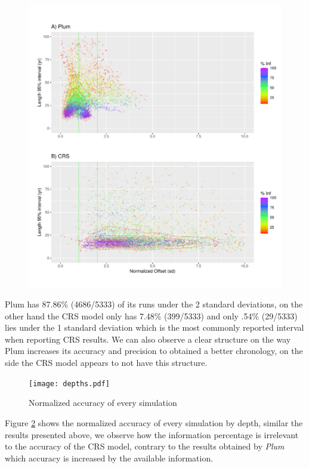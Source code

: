 \documentclass [10pt] {article}
\begin{document}
\begin{figure}
 \centering
  \includegraphics[width=\linewidth]{Maps.pdf}
	\caption{}
  \label{fig:maps}
\end{figure}


Plum has 87.86\% (4686/5333) of its runs under the 2 standard deviations, on the other hand the CRS model only has 7.48\% (399/5333) and only .54\% (29/5333) lies under the 1 standard deviation which is the most commonly reported interval when reporting CRS results.
We can also observe a clear structure on the way Plum increases its accuracy and precision to obtained a better chronology, on the side the CRS model appears to not have this structure. 


\begin{figure}
	\begin{centering}
		\texttt{[image: depths.pdf]}
		\caption{Normalized accuracy of every simulation }
		\label{fig:depths}
	\end{centering}
\end{figure}

Figure \ref{fig:depths} shows the normalized accuracy of every simulation by depth, similar the results presented above, we observe how the information percentage is irrelevant to the accuracy of the CRS model, contrary to the results obtained by \textit{Plum} which accuracy is increased by the available information. 
\end{document}
